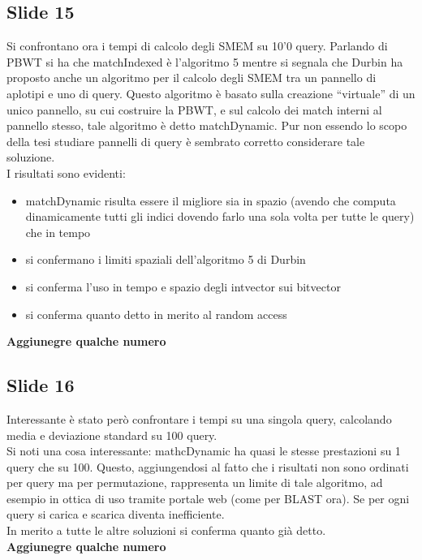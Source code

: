 \documentclass[a4paper,11pt, oneside,italian]{article}
\begin{document}
\subsection*{Slide 15}
Si confrontano ora i tempi di calcolo degli SMEM su 10'0 query. Parlando di PBWT
si ha che matchIndexed è l'algoritmo 5 mentre si segnala
che Durbin ha proposto anche un algoritmo per il calcolo degli SMEM tra un
pannello di  aplotipi e uno di query. Questo algoritmo è basato sulla creazione
“virtuale” di un unico pannello, su cui costruire la PBWT, e sul calcolo dei
match interni al pannello stesso, tale algoritmo è detto matchDynamic. Pur non
essendo lo scopo della tesi studiare pannelli di query è sembrato corretto
considerare tale soluzione.\\
I risultati sono evidenti:
\begin{itemize}
  \item matchDynamic risulta essere il migliore sia in spazio (avendo che
  computa dinamicamente tutti gli indici dovendo farlo una sola volta per tutte
  le query) che in tempo
  \item si confermano i limiti spaziali dell'algoritmo 5 di Durbin
  \item si conferma l'uso in tempo e spazio degli intvector sui bitvector
  \item si conferma quanto detto in merito al random access
\end{itemize}
\textbf{Aggiunegre qualche numero}
\subsection*{Slide 16}
Interessante è stato però confrontare i tempi su una singola query, calcolando
media e deviazione standard su 100 query.\\
Si noti una cosa interessante: mathcDynamic ha quasi le stesse prestazioni su 1
query che su 100. Questo, aggiungendosi al fatto che i risultati non sono
ordinati per query ma per permutazione, rappresenta un limite di tale algoritmo,
ad esempio in ottica di uso tramite portale web (come per BLAST ora). Se per
ogni query si carica e scarica diventa inefficiente. \\
In merito a tutte le altre soluzioni si conferma quanto già detto.\\
\textbf{Aggiunegre qualche numero}
\end{document}
